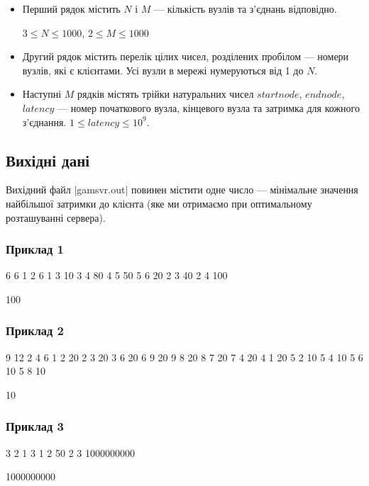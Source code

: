 \documentclass[12pt,a4paper]{article}
\begin{document}
\begin{itemize}
    \item Перший рядок містить \(N\) і \(M\) --- кількість вузлів та з’єднань відповідно.

    \(3 \leq N \leq 1000\), \(2 \leq M \leq 1000\)
    \item Другий рядок містить перелік цілих чисел, розділених пробілом --- номери вузлів, які є клієнтами. Усі вузли в мережі нумеруються від 1 до \(N\).
    \item Наступні \(M\) рядків містять трійки натуральних чисел \(startnode\), \(endnode\), \(latency\) --- номер початкового вузла, кінцевого вузла та затримка для кожного з’єднання. \(1 \leq latency \leq 10^9\).
\end{itemize}


\subsection*{Вихідні дані}

Вихідний файл |gamsvr.out| повинен містити одне число --- мінімальне значення найбільшої затримки до клієнта (яке ми отримаємо при оптимальному розташуванні сервера).


\pagebreak


\subsubsection*{Приклад 1}

\textbf{}

\begin{codeblock}
6 6
1 2 6
1 3 10
3 4 80
4 5 50
5 6 20
2 3 40
2 4 100
\end{codeblock}

\textbf{}

\begin{codeblock}
100
\end{codeblock}


\subsubsection*{Приклад 2}

\textbf{}

\begin{codeblock}
9 12
2 4 6
1 2 20
2 3 20
3 6 20
6 9 20
9 8 20
8 7 20
7 4 20
4 1 20
5 2 10
5 4 10
5 6 10
5 8 10
\end{codeblock}

\textbf{}

\begin{codeblock}
10
\end{codeblock}


\subsubsection*{Приклад 3}

\textbf{}

\begin{codeblock}
3 2
1 3
1 2 50
2 3 1000000000
\end{codeblock}

\textbf{}

\begin{codeblock}
1000000000
\end{codeblock}
\end{document}
